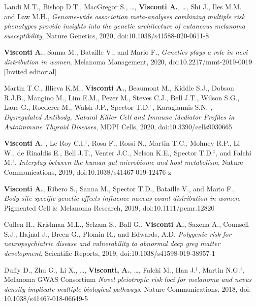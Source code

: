 \documentclass[a4paper,10pt]{article}
\begin{document}
{\begin{itemize}
		 Landi M.T., Bishop D.T., MacGregor S., \dots, \textbf{Visconti A.}, \dots, Shi J., Iles M.M. and Law M.H., \emph{Genome-wide association meta-analyses combining multiple risk phenotypes provide insights into the genetic architecture of cutaneous melanoma susceptibility}, Nature Genetics, 2020, doi:10.1038/s41588-020-0611-8	
		
		 \textbf{Visconti A.}, Sanna M., Bataille V., and Mario F., \emph{Genetics plays a role in nevi distribution in women}, Melanoma Management, 2020, doi:10.2217/mmt-2019-0019 [Invited editorial]
		
		 Martin T.C., Illieva K.M., \textbf{Visconti A.}, Beaumont M., Kiddle S.J., Dobson R.J.B., Mangino M., Lim E.M., Pezer M., Steves C.J., Bell J.T., Wilson S.G., Lauc G., Roederer M., Walsh J.P., Spector T.D.$^{\textbf{$\ddag $}}$, Karagiannis S.N.$^{\textbf{$\ddag $}}$, \emph{Dysregulated Antibody, Natural Killer Cell and Immune Mediator Profiles in Autoimmune Thyroid Diseases}, MDPI Cells, 2020, doi:10.3390/cells9030665
		
		 \textbf{Visconti A.}$^{\textbf{$\dag $}}$, Le Roy C.I.$^{\textbf{$\dag $}}$, Rosa F., Rossi N., Martin T.C., Mohney R.P., Li W., de Rinaldis E., Bell J.T., Venter J.C., Nelson K.E., Spector T.D.$^{\textbf{$\ddag $}}$, and Falchi M.$^{\textbf{$\ddag $}}$, \emph{Interplay between the human gut microbiome and host metabolism}, Nature Communications, 2019, doi:10.1038/s41467-019-12476-z
		
		 \textbf{Visconti A.}, Ribero S., Sanna M., Spector T.D., Bataille V., and Mario F., \emph{Body site-specific genetic effects influence naevus count distribution in women}, Pigmented Cell \& Melanoma Research, 2019, doi:10.1111/pcmr.12820
		
		 Cullen H., Krishnan M.L., Selzam S., Ball G., \textbf{Visconti A.}, Saxena A., Counsell S.J., Hajnal J., Breen G., Plomin R., and Edwards, A.D. \emph{Polygenic risk for neuropsychiatric disease and vulnerability to abnormal deep grey matter development}, Scientific Reports, 2019, doi:10.1038/s41598-019-38957-1
		
		 Duffy D., Zhu G., Li X., \dots, \textbf{Visconti, A.}, \dots, Falchi M., Han J.$^{\textbf{$\ddag $}}$, Martin N.G.$^{\textbf{$\ddag $}}$, Melanoma GWAS Consortium \emph{Novel pleiotropic risk loci for melanoma and nevus density implicate multiple biological pathways}, Nature Communications, 2018, doi: 10.1038/s41467-018-06649-5		
			
		
	\end{itemize}
}
\end{document}
